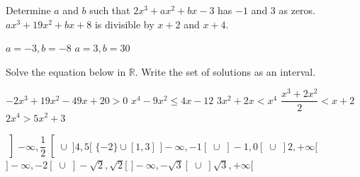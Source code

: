 
\ifanalysis
\begin{Exercise}[difficulty = 2] Determine $a$ and $b$ such that
    	\Question $2x^3+ax^2+bx-3$ has $-1$ and $3$ as zeros.
    	\Question $ax^3+19x^2+bx+8$ is divisible by $x+2$ and $x+4$.

\end{Exercise}

\begin{Answer}\phantom{}
    
    \Question $a=-3, b=-8$
    \Question $a=3, b= 30 $
\end{Answer}

\fi

\begin{Exercise} Solve the equation below in $\mathbb{R}$. Write the set of solutions as an interval.
	\begin{multicols}{2}
    	\Question[difficulty = 1] $-2x^3+19x^2-49x+20>0 $
        \ifanalysis\Question[difficulty = 1]\fi\ifcalculus\Question[difficulty = 2]\fi $x^4-9x^2 \leq 4x-12 $
        \ifanalysis\Question[difficulty = 1]\fi\ifcalculus\Question[difficulty = 2]\fi $3x^2+2x < x^4$
        \Question[difficulty = 1] $\dfrac{x^3+2x^2}{2} < x+2$
        \ifanalysis\Question[difficulty = 1]\fi\ifcalculus\Question[difficulty = 2]\fi $2x^4 > 5x^2+3$
    	\EndCurrentQuestion
	\end{multicols}

\end{Exercise}

\begin{Answer}\phantom{}
    \begin{multicols}{2}
    
    	\Question $\left]-\infty, \dfrac{1}{2}\right[ \cup \; ]4,5[$
        \Question $\{-2\} \cup [1,3]$
        \Question $]-\infty,-1[ \;\cup \;]-1,0[\; \cup\; ]2, +\infty[$
        \Question $]-\infty,-2[ \;\cup\; ]-\sqrt{2}, \sqrt{2}[$
        \Question $]-\infty,-\sqrt{3}[\; \cup \;]\sqrt{3}, + \infty[$
    \EndCurrentQuestion
    \end{multicols}
\end{Answer}

\subsection*{}

